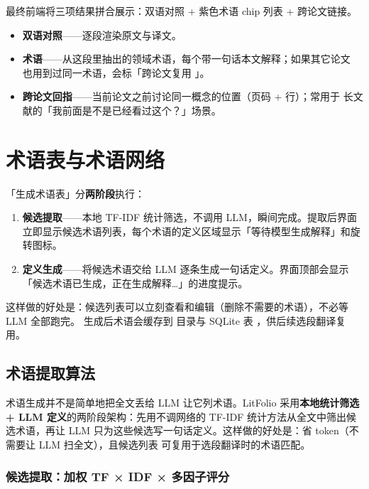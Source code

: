 最终前端将三项结果拼合展示：双语对照 + 紫色术语 chip 列表 + 跨论文链接。
\begin{itemize}
  \item \textbf{双语对照}——逐段渲染原文与译文。
  \item \textbf{术语}——从这段里抽出的领域术语，每个带一句话本文解释；如果其它论文
    也用到过同一术语，会标「跨论文复用 」。
  \item \textbf{跨论文回指}——当前论文之前讨论同一概念的位置（页码 + 行）；常用于
    长文献的「我前面是不是已经看过这个？」场景。
\end{itemize}

\section{术语表与术语网络}


「生成术语表」分\textbf{两阶段}执行：

\begin{enumerate}
  \item \textbf{候选提取}——本地 TF-IDF 统计筛选，不调用 LLM，瞬间完成。提取后界面
    立即显示候选术语列表，每个术语的定义区域显示「等待模型生成解释」和旋转图标。
  \item \textbf{定义生成}——将候选术语交给 LLM 逐条生成一句话定义。界面顶部会显示
    「候选术语已生成，正在生成解释…」的进度提示。
\end{enumerate}

这样做的好处是：候选列表可以立刻查看和编辑（删除不需要的术语），不必等 LLM 全部跑完。
生成后术语会缓存到  目录与 SQLite 表 ，供后续选段翻译复用。

\subsection{术语提取算法}

术语生成并不是简单地把全文丢给 LLM 让它列术语。LitFolio 采用\textbf{本地统计筛选 +
LLM 定义}的两阶段架构：先用不调网络的 TF-IDF 统计方法从全文中筛出候选术语，再让 LLM
只为这些候选写一句话定义。这样做的好处是：省 token（不需要让 LLM 扫全文），且候选列表
可复用于选段翻译时的术语匹配。

\subsubsection{候选提取：加权 TF × IDF × 多因子评分}

